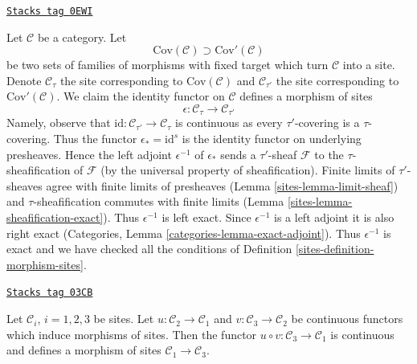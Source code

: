 \begin{example}
\label{sites-example-finer-topology}
\href{https://stacks.math.columbia.edu/tag/0EWI}{\texttt{Stacks tag 0EWI}}

Let $\mathcal{C}$ be a category. Let
$$
\text{Cov}(\mathcal{C}) \supset \text{Cov}'(\mathcal{C})
$$
be two sets of families of morphisms with fixed target
which turn $\mathcal{C}$ into a site. Denote $\mathcal{C}_\tau$
the site corresponding to $\text{Cov}(\mathcal{C})$ and
$\mathcal{C}_{\tau'}$ the site corresponding to $\text{Cov}'(\mathcal{C})$.
We claim the identity functor on $\mathcal{C}$ defines a morphism of sites
$$
\epsilon : \mathcal{C}_\tau \longrightarrow \mathcal{C}_{\tau'}
$$
Namely, observe that $\text{id} : \mathcal{C}_{\tau'} \to \mathcal{C}_\tau$
is continuous as every
$\tau'$-covering is a $\tau$-covering. Thus the functor
$\epsilon_* = \text{id}^s$ is the identity functor on underlying
presheaves. Hence the left adjoint $\epsilon^{-1}$
of $\epsilon_*$ sends a $\tau'$-sheaf $\mathcal{F}$
to the $\tau$-sheafification of $\mathcal{F}$ (by the
universal property of sheafification).
Finite limits of $\tau'$-sheaves agree with finite limits
of presheaves (Lemma \ref{sites-lemma-limit-sheaf}) and $\tau$-sheafification
commutes with finite limits (Lemma \ref{sites-lemma-sheafification-exact}).
Thus $\epsilon^{-1}$ is left exact. Since $\epsilon^{-1}$
is a left adjoint it is also right exact
(Categories, Lemma \ref{categories-lemma-exact-adjoint}).
Thus $\epsilon^{-1}$ is exact and we have checked all the
conditions of Definition \ref{sites-definition-morphism-sites}.
\end{example}

\begin{lemma}
\label{sites-lemma-composition-morphisms-sites}
\href{https://stacks.math.columbia.edu/tag/03CB}{\texttt{Stacks tag 03CB}}


Let $\mathcal{C}_i$, $i = 1, 2, 3$ be sites. Let
$u : \mathcal{C}_2 \to \mathcal{C}_1$ and
$v : \mathcal{C}_3 \to \mathcal{C}_2$ be continuous functors
which induce morphisms of sites. Then the functor
$u \circ v : \mathcal{C}_3 \to \mathcal{C}_1$ is continuous and
defines a morphism of sites $\mathcal{C}_1 \to \mathcal{C}_3$.
\end{lemma}

